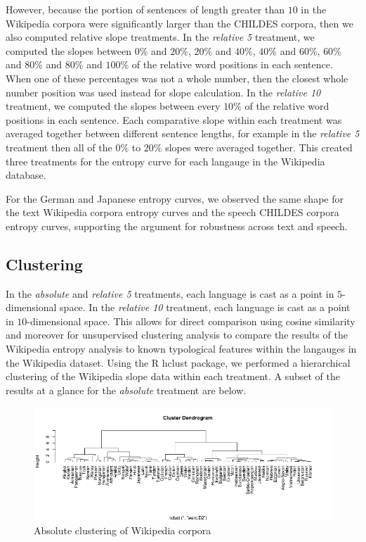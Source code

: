 \documentclass[10pt, letterpaper]{article}
\newenvironment{CodeChunk}{}{}
\begin{document}
However, because the portion of sentences of length greater than \(10\)
in the Wikipedia corpora were significantly larger than the CHILDES
corpora, then we also computed relative slope treatments. In the
\emph{relative 5} treatment, we computed the slopes between \(0\%\) and
\(20\%\), \(20\%\) and \(40\%\), \(40\%\) and \(60\%\), \(60\%\) and
\(80\%\) and \(80\%\) and \(100\%\) of the relative word positions in
each sentence. When one of these percentages was not a whole number,
then the closest whole number position was used instead for slope
calculation. In the \emph{relative 10} treatment, we computed the slopes
between every \(10\%\) of the relative word positions in each sentence.
Each comparative slope within each treatment was averaged together
between different sentence lengths, for example in the \emph{relative 5}
treatment then all of the \(0\%\) to \(20\%\) slopes were averaged
together. This created three treatments for the entropy curve for each
langauge in the Wikipedia database.

For the German and Japanese entropy curves, we observed the same shape
for the text Wikipedia corpora entropy curves and the speech CHILDES
corpora entropy curves, supporting the argument for robustness across
text and speech.

\subsection{Clustering}\label{clustering}

In the \emph{absolute} and \emph{relative 5} treatments, each language
is cast as a point in \(5\)-dimensional space. In the \emph{relative 10}
treatment, each language is cast as a point in \(10\)-dimensional space.
This allows for direct comparison using cosine similarity and moreover
for unsupervised clustering analysis to compare the results of the
Wikipedia entropy analysis to known typological features within the
langauges in the Wikipedia dataset. Using the R hclust package, we
performed a hierarchical clustering of the Wikipedia slope data within
each treatment. A subset of the results at a glance for the
\emph{absolute} treatment are below.

\begin{CodeChunk}
\begin{figure}[h]

{\centering \includegraphics{figs/absolute_clusters-1} 

}

\caption[Absolute clustering of Wikipedia corpora]{Absolute clustering of Wikipedia corpora}\label{fig:absolute_clusters}
\end{figure}
\end{CodeChunk}
\end{document}
